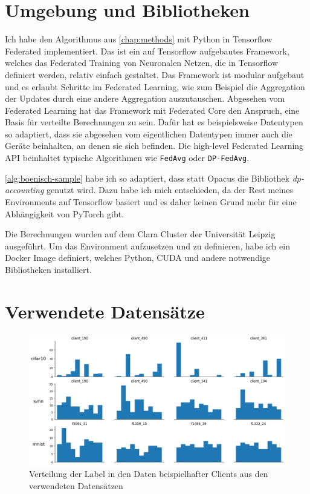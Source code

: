 \section{Umgebung und Bibliotheken}
Ich habe den Algorithmus aus \autoref{chap:methods} mit Python in Tensorflow Federated implementiert. Das ist ein auf Tensorflow aufgebautes Framework, welches das Federated Training von Neuronalen Netzen, die in Tensorflow definiert werden, relativ einfach gestaltet. Das Framework ist modular aufgebaut und es erlaubt Schritte im Federated Learning, wie zum Beispiel die Aggregation der Updates durch eine andere Aggregation auszutauschen. Abgesehen vom Federated Learning hat das Framework mit Federated Core den Anspruch, eine Basis für verteilte Berechnungen zu sein. Dafür hat es beispielsweise Datentypen so adaptiert, dass sie abgesehen vom eigentlichen Datentypen immer auch die Geräte beinhalten, an denen sie sich befinden. Die high-level Federated Learning API beinhaltet typische Algorithmen wie \texttt{FedAvg} oder \texttt{DP-FedAvg}.

\autoref{alg:boenisch-sample} habe ich so adaptiert, dass statt Opacus die Bibliothek \textit{dp-accounting} genutzt wird. Dazu habe ich mich entschieden, da der Rest meines Environments auf Tensorflow basiert und es daher keinen Grund mehr für eine Abhängigkeit von PyTorch gibt.

Die Berechnungen wurden auf dem Clara Cluster der Universität Leipzig ausgeführt. Um das Environment aufzusetzen und zu definieren, habe ich ein Docker Image definiert, welches Python, CUDA und andere notwendige Bibliotheken installiert.

\section{Verwendete Datensätze}

\begin{figure}[tb]
	\centering
	\includegraphics[width=\textwidth]{Bilder/label_distribution.png}
	\caption{Verteilung der Label in den Daten beispielhafter Clients aus den verwendeten Datensätzen}
	\label{fig:label-distribution}
\end{figure}

